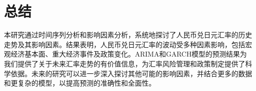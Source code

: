 
\chapter{总结}
本研究通过时间序列分析和影响因素分析，系统地探讨了人民币兑日元汇率的历史走势及其影响因素。结果表明，人民币兑日元汇率的波动受多种因素影响，包括宏观经济基本面、重大经济事件及政策变化。ARIMA和GARCH模型的预测结果为我们提供了关于未来汇率走势的有价值信息，为汇率风险管理和政策制定提供了科学依据。未来的研究可以进一步深入探讨其他可能的影响因素，并结合更多的数据和更复杂的模型，以提高预测的准确性和全面性。

